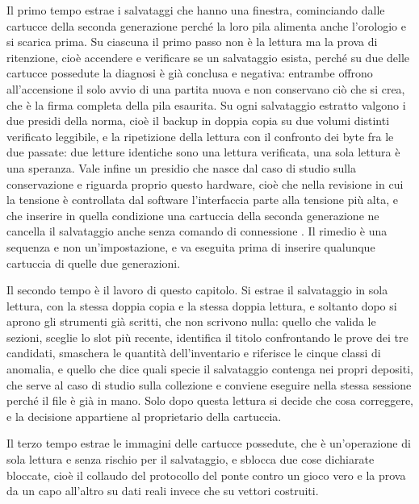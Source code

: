 Il primo tempo estrae i salvataggi che hanno una finestra, cominciando dalle cartucce della seconda generazione perché la loro pila alimenta anche l'orologio e si scarica prima. Su ciascuna il primo passo non è la lettura ma la prova di ritenzione, cioè accendere e verificare se un salvataggio esista, perché su due delle cartucce possedute la diagnosi è già conclusa e negativa: entrambe offrono all'accensione il solo avvio di una partita nuova e non conservano ciò che si crea, che è la firma completa della pila esaurita. Su ogni salvataggio estratto valgono i due presidi della norma, cioè il backup in doppia copia su due volumi distinti verificato leggibile, e la ripetizione della lettura con il confronto dei byte fra le due passate: due letture identiche sono una lettura verificata, una sola lettura è una speranza. Vale infine un presidio che nasce dal caso di studio sulla conservazione e riguarda proprio questo hardware, cioè che nella revisione in cui la tensione è controllata dal software l'interfaccia parte alla tensione più alta, e che inserire in quella condizione una cartuccia della seconda generazione ne cancella il salvataggio anche senza comando di connessione \cite{insidegadgets-canale}. Il rimedio è una sequenza e non un'impostazione, e va eseguita prima di inserire qualunque cartuccia di quelle due generazioni.

Il secondo tempo è il lavoro di questo capitolo. Si estrae il salvataggio in sola lettura, con la stessa doppia copia e la stessa doppia lettura, e soltanto dopo si aprono gli strumenti già scritti, che non scrivono nulla: quello che valida le sezioni, sceglie lo slot più recente, identifica il titolo confrontando le prove dei tre candidati, smaschera le quantità dell'inventario e riferisce le cinque classi di anomalia, e quello che dice quali specie il salvataggio contenga nei propri depositi, che serve al caso di studio sulla collezione e conviene eseguire nella stessa sessione perché il file è già in mano. Solo dopo questa lettura si decide che cosa correggere, e la decisione appartiene al proprietario della cartuccia.

Il terzo tempo estrae le immagini delle cartucce possedute, che è un'operazione di sola lettura e senza rischio per il salvataggio, e sblocca due cose dichiarate bloccate, cioè il collaudo del protocollo del ponte contro un gioco vero e la prova da un capo all'altro su dati reali invece che su vettori costruiti.

